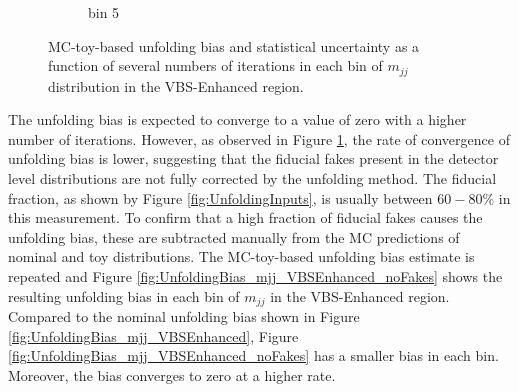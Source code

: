 \begin{figure}[htb]
\begin{subfigure}{.48\textwidth}
        \caption{bin 5 }
    \end{subfigure}
    \caption{ MC-toy-based unfolding bias and statistical uncertainty as a function of several numbers of iterations in each bin of $m_{jj}$ distribution in the VBS-Enhanced region. \label{fig:UnfoldingBiasStat_mjj_VBSEnhanced}}
\end{figure}

The unfolding bias is expected to converge to a value of zero with a higher number of iterations. However, as observed in Figure \ref{fig:UnfoldingBiasStat_mjj_VBSEnhanced}, the rate of convergence of unfolding bias is lower, suggesting that the fiducial fakes present in the detector level distributions are not fully corrected by the unfolding method. The fiducial fraction, as shown by Figure \ref{fig:UnfoldingInputs}, is usually between $60-80\%$ in this measurement. To confirm that a high fraction of fiducial fakes causes the unfolding bias, these are subtracted manually from the MC predictions of nominal and toy distributions. The MC-toy-based unfolding bias estimate is repeated and Figure \ref{fig:UnfoldingBias_mjj_VBSEnhanced_noFakes} shows the resulting unfolding bias in each bin of $m_{jj}$ in the VBS-Enhanced region. Compared to the nominal unfolding bias shown in Figure \ref{fig:UnfoldingBias_mjj_VBSEnhanced}, Figure \ref{fig:UnfoldingBias_mjj_VBSEnhanced_noFakes} has a smaller bias in each bin. Moreover, the bias converges to zero at a higher rate.

